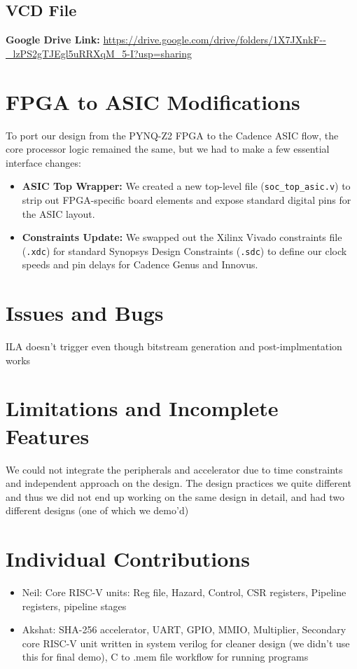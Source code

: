 \documentclass[11pt,a4paper]{article}
\begin{document}
\subsection{VCD File}
\textbf{Google Drive Link:} \url{https://drive.google.com/drive/folders/1X7JXnkF--_lzPS2gTJEgl5uRRXqM_5-I?usp=sharing}

\section{FPGA to ASIC Modifications}

To port our design from the PYNQ-Z2 FPGA to the Cadence ASIC flow, the core processor logic remained the same, but we had to make a few essential interface changes:

\begin{itemize}
    \item \textbf{ASIC Top Wrapper:} We created a new top-level file (\texttt{soc\_top\_asic.v}) to strip out FPGA-specific board elements and expose standard digital pins for the ASIC layout.
    \item \textbf{Constraints Update:} We swapped out the Xilinx Vivado constraints file (\texttt{.xdc}) for standard Synopsys Design Constraints (\texttt{.sdc}) to define our clock speeds and pin delays for Cadence Genus and Innovus.
\end{itemize}

\section{Issues and Bugs}

ILA doesn't trigger even though bitstream generation and post-implmentation works

\section{Limitations and Incomplete Features}
We could not integrate the peripherals and accelerator due to time constraints and independent approach on the design. The design practices we quite different and thus we did not end up working on the same design in detail, and had two different designs (one of which we demo'd)


\section{Individual Contributions}
\begin{itemize}
	A shared discussion over the design was done, then the verilog implementation was done independently 
    \item Neil: Core RISC-V units: Reg file, Hazard, Control, CSR registers, Pipeline registers, pipeline stages   
    \item Akshat: SHA-256 accelerator, UART, GPIO, MMIO, Multiplier, Secondary core RISC-V unit written in system verilog for cleaner design (we didn't use this for final demo), C to .mem file workflow for running programs 
\end{itemize}
\end{document}
